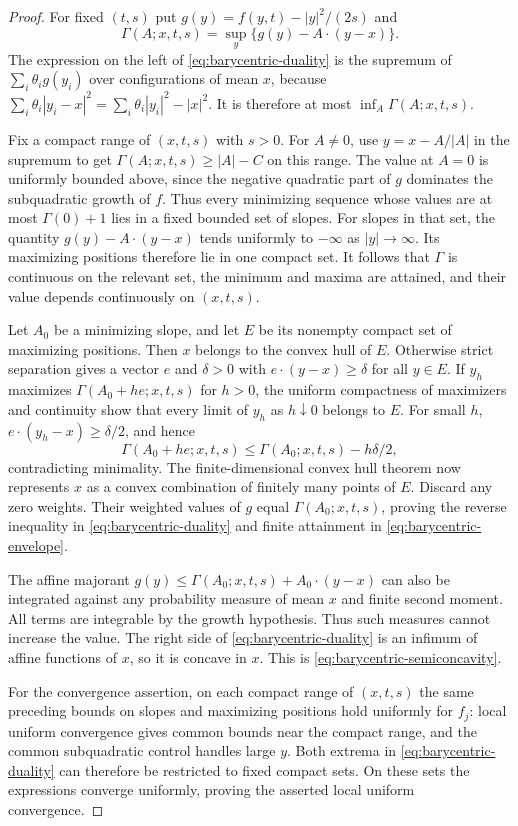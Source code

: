 \begin{proof}
For fixed $(t,s)$ put $g(y)=f(y,t)-|y|^2/(2s)$ and
\[
  \Gamma(A;x,t,s)=\sup_y\{g(y)-A\cdot(y-x)\}.
\]
The expression on the left of \eqref{eq:barycentric-duality}
is the supremum of $\sum_i\theta_i g(y_i)$ over configurations
of mean $x$, because
$\sum_i\theta_i|y_i-x|^2=\sum_i\theta_i|y_i|^2-|x|^2$.
It is therefore at most $\inf_A\Gamma(A;x,t,s)$.

Fix a compact range of $(x,t,s)$ with $s>0$. For $A\ne0$, use
$y=x-A/|A|$ in the supremum to get
$\Gamma(A;x,t,s)\ge |A|-C$ on this range. The value at $A=0$
is uniformly bounded above, since the negative quadratic part
of $g$ dominates the subquadratic growth of $f$. Thus every
minimizing sequence whose values are at most $\Gamma(0)+1$
lies in a fixed bounded set of slopes.
For slopes in that set, the quantity
$g(y)-A\cdot(y-x)$ tends uniformly to $-\infty$ as
$|y|\to\infty$. Its maximizing positions therefore lie in one
compact set. It follows that $\Gamma$ is continuous on the
relevant set, the minimum and maxima are attained, and their
value depends continuously on $(x,t,s)$.

Let $A_0$ be a minimizing slope, and let $E$ be its nonempty
compact set of maximizing positions. Then $x$ belongs to the
convex hull of $E$. Otherwise strict separation gives a vector
$e$ and $\delta>0$ with
$e\cdot(y-x)\ge\delta$ for all $y\in E$. If $y_h$ maximizes
$\Gamma(A_0+he;x,t,s)$ for $h>0$, the uniform compactness of
maximizers and continuity show that every limit of $y_h$ as
$h\downarrow0$ belongs to $E$. For small $h$,
$e\cdot(y_h-x)\ge\delta/2$, and hence
\[
  \Gamma(A_0+he;x,t,s)
   \le\Gamma(A_0;x,t,s)-h\delta/2,
\]
contradicting minimality. The finite-dimensional convex hull
theorem now represents $x$ as a convex combination of finitely
many points of $E$. Discard any zero weights. Their weighted
values of $g$ equal $\Gamma(A_0;x,t,s)$, proving the reverse
inequality in \eqref{eq:barycentric-duality} and finite
attainment in \eqref{eq:barycentric-envelope}.

The affine majorant
$g(y)\le\Gamma(A_0;x,t,s)+A_0\cdot(y-x)$ can also be
integrated against any probability measure of mean $x$ and
finite second moment. All terms are integrable by the growth
hypothesis. Thus such measures cannot increase the value.
The right side of \eqref{eq:barycentric-duality} is an infimum
of affine functions of $x$, so it is concave in $x$. This is
\eqref{eq:barycentric-semiconcavity}.

For the convergence assertion, on each compact range of
$(x,t,s)$ the same preceding bounds on slopes and maximizing
positions hold uniformly for $f_j$: local uniform convergence
gives common bounds near the compact range, and the common
subquadratic control handles large $y$. Both extrema in
\eqref{eq:barycentric-duality} can therefore be restricted to
fixed compact sets. On these sets the expressions converge
uniformly, proving the asserted local uniform convergence.
\end{proof}


